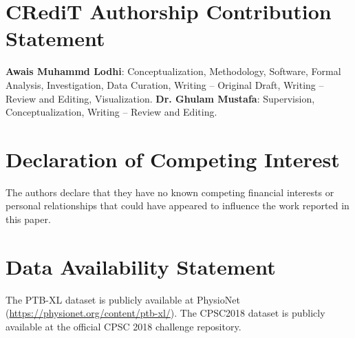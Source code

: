 \documentclass[12pt]{elsarticle}
\begin{document}
\section*{CRediT Authorship Contribution Statement}
\textbf{Awais Muhammd Lodhi}: Conceptualization, Methodology, Software, Formal Analysis, Investigation, Data Curation, Writing -- Original Draft, Writing -- Review and Editing, Visualization.
\textbf{Dr. Ghulam Mustafa}: Supervision, Conceptualization, Writing -- Review and Editing.

\section*{Declaration of Competing Interest}
The authors declare that they have no known competing financial interests or personal relationships that could have appeared to influence the work reported in this paper.

\section*{Data Availability Statement}
The PTB-XL dataset is publicly available at PhysioNet (\url{https://physionet.org/content/ptb-xl/}). The CPSC2018 dataset is publicly available at the official CPSC 2018 challenge repository.



\end{document}

